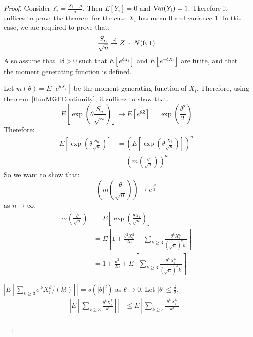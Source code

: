 \documentclass[../Main.tex]{subfiles}
\begin{document}
\begin{proof}
    Consider $Y_i = \frac{X_i - \mu}{\sigma}$. Then $E[Y_i] = 0$ and $\operatorname{Var}(Y_i) = 1$. Therefore it suffices to prove the theorem for the case $X_i$ has mean 0 and variance 1.
    In this case, we are required to prove that:
    \begin{equation*}
        \frac{S_n}{\sqrt{n}} \overset{d}{\rightarrow} Z \sim N(0, 1)
    \end{equation*}
    Also assume that $\exists \delta > 0$ such that $E[e^{\delta X_i}]$ and $E[e^{-\delta X_i}]$ are finite, and that the moment generating function is defined.
    
    Let $m(\theta) = E[e^{\theta X_i}]$ be the moment generating function of $X_i$. Therefore, using theorem~\ref{thmMGFContinuity}, it suffices to show that:
    \begin{equation*}
        E\left[\exp\left(\theta \frac{S_n}{\sqrt{n}}\right)\right] \to E\left[e^{\theta Z}\right] = \exp\left(\frac{\theta^2}{2}\right)
    \end{equation*}
    Therefore:
    \begin{align*}
        E\left[\exp\left(\theta\frac{S_n}{\sqrt{n}}\right)\right] &= \left(E\left[\exp\left(\theta \frac{X_i}{\sqrt{n}}\right)\right]\right)^n \\
        &= \left(m\left(\frac{\theta}{\sqrt{n}}\right)\right)^n
    \end{align*}
    So we want to show that:
    \begin{equation*}
        \left(m\left(\frac{\theta}{\sqrt{n}}\right)\right) \to e^\frac{\theta^2}{2}
    \end{equation*}
    as $n \to \infty$.
    \begin{align*}
        m\left(\frac{\theta}{\sqrt{n}}\right) &= E\left[\exp\left(\frac{\theta X_i}{\sqrt{n}}\right)\right] \\
        &= E\left[1 + \frac{\theta^2X_i^2}{2n} + \sum_{k \geq 3} \frac{\theta^k X_i^k}{\left(\sqrt{n}\right)^k k!}\right] \\
        &= 1 + \frac{\theta^2}{2n} + E\left[\sum_{k \geq 3} \frac{\theta^k X_i^k}{\left(\sqrt{n}\right)^k k!}\right]
    \end{align*}
    \begin{subproof}{$\left|E\left[\sum_{k \geq 3} \sigma^k X_i^k / (k!)\right]\right| = o(|\theta|^2)$ as $\theta \to 0$.}
        Let $|\theta| \leq \frac{\delta}{2}$.
        \begin{align*}
            \left|E\left[\sum_{k \geq 3} \frac{\theta^k X_i^k}{k!}\right]\right| &\leq E\left[\sum_{k \geq 3} \frac{|\theta^k X_i^k|}{k!}\right] \\

\end{align*}
\end{subproof}
\end{proof}
\end{document}
